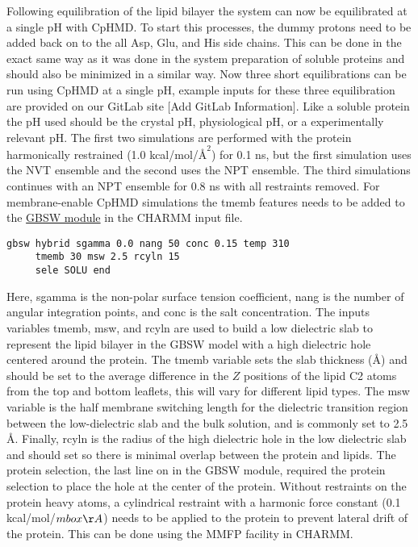 \documentclass[9pt,tutorial]{livecoms}
\begin{document}
Following equilibration of the lipid bilayer the system can now be equilibrated at a single pH with CpHMD. 
To start this processes, the dummy protons need to be added back on to the all Asp, Glu, and His side chains. 
This can be done in the exact same way as it was done in the system preparation of soluble proteins and should also be minimized in a similar way.
Now three short equilibrations can be run using CpHMD at a single pH, example inputs for these three equilibration are provided on our GitLab site [Add GitLab Information]. 
Like a soluble protein the pH used should be the crystal pH, physiological pH, or a experimentally relevant pH.
The first two simulations are performed with the protein harmonically restrained (1.0 kcal/mol/$\mbox{\AA}^2$) for 0.1 ns, but the first simulation uses the NVT ensemble and the second uses the NPT ensemble.
The third simulations continues with an NPT ensemble for 0.8 ns with all restraints removed. 
For membrane-enable CpHMD simulations the tmemb features needs to be added to the \href{https://hpc.nih.gov/apps/charmm/c42b2html/gbsw.html}{GBSW module} in the CHARMM input file. 
%
\begin{lstlisting}
gbsw hybrid sgamma 0.0 nang 50 conc 0.15 temp 310 
     tmemb 30 msw 2.5 rcyln 15                      
     sele SOLU end
\end{lstlisting}
%
Here, sgamma is the non-polar surface tension coefficient, nang is the number of angular integration points, and conc is the salt concentration.
The inputs variables tmemb, msw, and rcyln are used to build a low dielectric slab to represent the lipid bilayer in the GBSW model with a high dielectric hole centered around the protein.
The tmemb variable sets the slab thickness ($\mbox{\AA}$) and should be set to the average difference in the $Z$ positions of the lipid C2 atoms from the top and bottom leaflets, this will vary for different lipid types. 
The msw variable is the half membrane switching length\cite{Im_BiophysJ_2003_v85_p2900} for the dielectric transition region between the low-dielectric slab and the bulk solution, and is commonly set to 2.5 $\mbox{\AA}$.
Finally, rcyln is the radius of the high dielectric hole in the low dielectric slab and should set so there is minimal overlap between the protein and lipids.
The protein selection, the last line on in the GBSW module, required the protein selection to place the hole at the center of the protein.
Without restraints on the protein heavy atoms, a cylindrical restraint with a harmonic force constant (0.1 kcal/mol/$mbox{\AA}$) needs to be applied to the protein to prevent lateral drift of the protein. 
This can be done using the MMFP facility in CHARMM.
\end{document}
